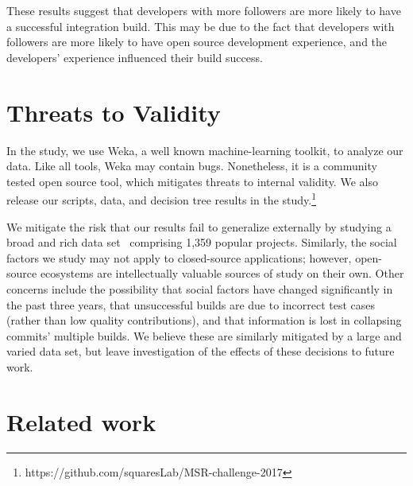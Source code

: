 \documentclass[10pt, conference]{IEEEtran}
\begin{document}
These results suggest that developers
with more followers are more likely to have a successful integration build.
This may be due to the fact that developers with followers are more likely to
have open source development experience, and the developers' experience
influenced their build success.

\section{Threats to Validity}
\label{sec-threats}

In the study, we use Weka, a well known machine-learning toolkit,
to analyze our data.
Like all tools, Weka may contain bugs. 
Nonetheless, it is a community tested open source tool, which mitigates threats to 
internal validity. We also release our scripts, data, and decision tree 
results in the study.\footnote{https://github.com/squaresLab/MSR-challenge-2017}

We mitigate the risk that our results fail to 
generalize externally by studying a broad and rich 
data set~\cite{msr17challenge} comprising 1,359 popular projects.
Similarly, the social factors we study may not apply to closed-source
applications; however, open-source ecosystems are intellectually
valuable sources of study on their own. 
%
 Other concerns include the possibility that social factors
 have changed significantly in the past three years, that unsuccessful
 builds are due to
 incorrect test cases (rather than low quality contributions), and that
 information is lost in collapsing commits' multiple builds. We believe these
 are similarly mitigated by a large and varied data set, but leave investigation
 of the effects of these decisions to future work. 
 
\section{Related work}
\end{document}
